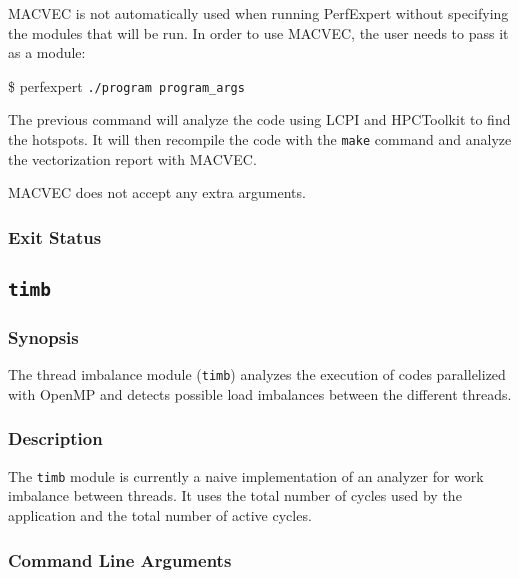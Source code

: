 MACVEC is not automatically used when running PerfExpert without specifying the modules that will be run.
In order to use MACVEC, the user needs to pass it as a module:


\vspace{10pt}
\$ \btt perfexpert  \tt{./program  program\_args}\par
\normalfont
\vspace{10pt}

The previous command will analyze the code using LCPI and HPCToolkit to find the hotspots. It will then
recompile the code with the \texttt{make} command and analyze the vectorization report with MACVEC.

MACVEC does not accept any extra arguments.

\subsubsection{Exit Status}

\subsection{\texttt{timb}}

\subsubsection{Synopsis}

The thread imbalance module (\texttt{timb}) analyzes the execution of codes parallelized with OpenMP
and detects possible load imbalances between the different threads. 

\subsubsection{Description}

The \texttt{timb} module is currently a naive implementation of an analyzer for work imbalance between
threads. It uses the total number of cycles used by the application and the total number of active cycles.

\subsubsection{Command Line Arguments}

